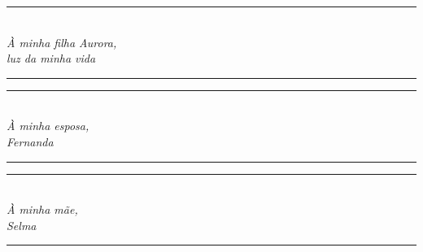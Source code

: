 \begin{titlingpage}
    
    \thispagestyle{empty}
        
    \vspace*{\fill}
    \centering
    \noindent
    \noindent\rule{5cm}{0.4pt}\\
    \vspace*{0.4cm}
    \large\textit{À minha filha Aurora,\\luz da minha vida}\\
    \noindent\rule{5cm}{0.4pt}
    \vspace*{\fill}
    
    \vspace*{\fill}
    \centering
    \noindent
    \noindent\rule{5cm}{0.4pt}\\
    \vspace*{0.4cm}
    \large\textit{À minha esposa,\\Fernanda}\\
    \noindent\rule{5cm}{0.4pt}
    \vspace*{\fill}
    
    \vspace*{\fill}
    \centering
    \noindent
    \noindent\rule{5cm}{0.4pt}\\
    \vspace*{0.4cm}
    \large\textit{À minha mãe,\\Selma}\\
    \noindent\rule{5cm}{0.4pt}
    \vspace*{\fill}
    
    \restoregeometry
    
\end{titlingpage}